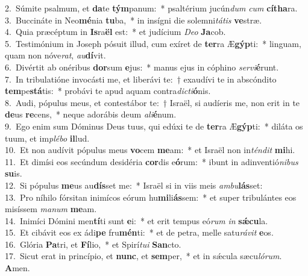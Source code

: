 {2.~}Súmite psalmum, et \textbf{da}te \textbf{tým}panum:~* psaltérium jucún\textit{dum} \textit{cum} \textbf{cí}\textbf{tha}ra.\\
{3.~}Buccináte in Neo\textbf{mé}nia \textbf{tu}ba,~* in insígni die solemni\textit{tá}\textit{tis} \textbf{ve}stræ.\\
{4.~}Quia præcéptum in \textbf{Is}ra\textbf{ël} est:~* et judícium \textit{De}\textit{o} \textbf{Ja}cob.\\
{5.~}Testimónium in Joseph pósuit illud, cum exíret de \textbf{ter}ra Æ\textbf{gýp}ti:~* linguam, quam non nóve\textit{rat}, \textit{au}\textbf{dí}vit.\\
{6.~}Divértit ab onéribus \textbf{dor}sum \textbf{e}jus:~* manus ejus in cóphino \textit{ser}\textit{vi}\textbf{é}runt.\\
{7.~}In tribulatióne invocásti me, et liberávi te:~† exaudívi te in abscóndito \textbf{tem}pe\textbf{stá}tis:~* probávi te apud aquam contra\textit{di}\textit{cti}\textbf{ó}nis.\\
{8.~}Audi, pópulus meus, et contestábor te:~† Israël, si audíeris me, non erit in te \textbf{de}us \textbf{re}cens,~* neque adorábis deum \textit{a}\textit{li}\textbf{é}num.\\
{9.~}Ego enim sum Dóminus Deus tuus, qui edúxi te de \textbf{ter}ra Æ\textbf{gýp}ti:~* diláta os tuum, et im\textit{plé}\textit{bo} \textbf{il}lud.\\
{10.~}Et non audívit pópulus meus \textbf{vo}cem \textbf{me}am:~* et Israël non in\textit{tén}\textit{dit} \textbf{mi}hi.\\
{11.~}Et dimísi eos secúndum desidéria \textbf{cor}dis e\textbf{ó}rum:~* ibunt in adinventió\textit{ni}\textit{bus} \textbf{su}is.\\
{12.~}Si pópulus \textbf{me}us au\textbf{dís}set me:~* Israël si in viis meis \textit{am}\textit{bu}\textbf{lás}set:\\
{13.~}Pro níhilo fórsitan inimícos eórum hu\textbf{mi}li\textbf{ás}sem:~* et super tribulántes eos misíssem \textit{ma}\textit{num} \textbf{me}am.\\
{14.~}Inimíci Dómini men\textbf{tí}ti sunt \textbf{e}i:~* et erit tempus eó\textit{rum} \textit{in} \textbf{sǽ}\textbf{cu}la.\\
{15.~}Et cibávit eos ex ádi\textbf{pe} fru\textbf{mén}ti:~* et de petra, melle satu\textit{rá}\textit{vit} \textbf{e}os.\\
{16.~}Glória \textbf{Pa}tri, et \textbf{Fí}lio,~* et Spirí\textit{tu}\textit{i} \textbf{San}cto.\\
{17.~}Sicut erat in princípio, et \textbf{nunc}, et \textbf{sem}per,~* et in sǽcula sæcu\textit{ló}\textit{rum}. \textbf{A}men.\\
